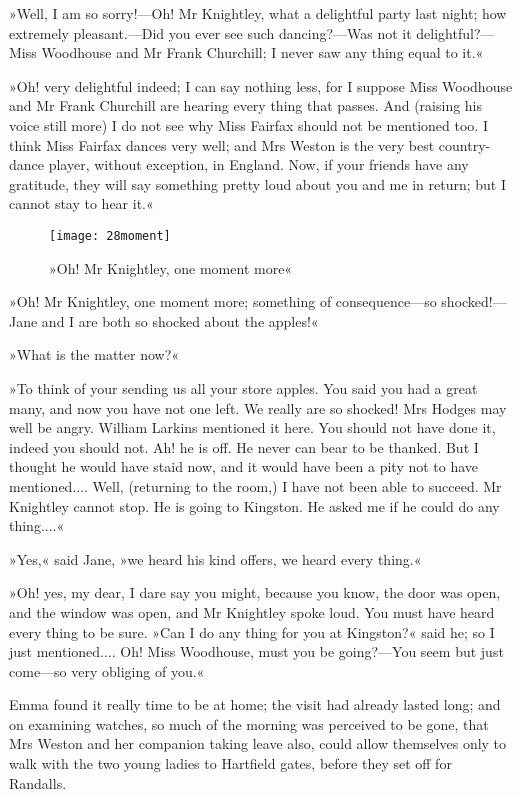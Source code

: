 »Well, I am so sorry!—Oh! Mr Knightley, what a delightful party last night; how extremely pleasant.—Did you ever see such dancing?—Was not it delightful?—Miss Woodhouse and Mr Frank Churchill; I never saw any thing equal to it.«

»Oh! very delightful indeed; I can say nothing less, for I suppose Miss Woodhouse and Mr Frank Churchill are hearing every thing that passes. And (raising his voice still more) I do not see why Miss Fairfax should not be mentioned too. I think Miss Fairfax dances very well; and Mrs Weston is the very best country-dance player, without exception, in England. Now, if your friends have any gratitude, they will say something pretty loud about you and me in return; but I cannot stay to hear it.«


\begin{figure}[tbph]
\centering
\texttt{[image: 28moment]}
\caption{»Oh! Mr Knightley, one moment more«}
\end{figure}

»Oh! Mr Knightley, one moment more; something of consequence—so shocked!—Jane and I are both so shocked about the apples!«

»What is the matter now?«

»To think of your sending us all your store apples. You said you had a great many, and now you have not one left. We really are so shocked! Mrs Hodges may well be angry. William Larkins mentioned it here. You should not have done it, indeed you should not. Ah! he is off. He never can bear to be thanked. But I thought he would have staid now, and it would have been a pity not to have mentioned.... Well, (returning to the room,) I have not been able to succeed. Mr Knightley cannot stop. He is going to Kingston. He asked me if he could do any thing....«

»Yes,« said Jane, »we heard his kind offers, we heard every thing.«

»Oh! yes, my dear, I dare say you might, because you know, the door was open, and the window was open, and Mr Knightley spoke loud. You must have heard every thing to be sure. »Can I do any thing for you at Kingston?« said he; so I just mentioned.... Oh! Miss Woodhouse, must you be going?—You seem but just come—so very obliging of you.«

Emma found it really time to be at home; the visit had already lasted long; and on examining watches, so much of the morning was perceived to be gone, that Mrs Weston and her companion taking leave also, could allow themselves only to walk with the two young ladies to Hartfield gates, before they set off for Randalls.